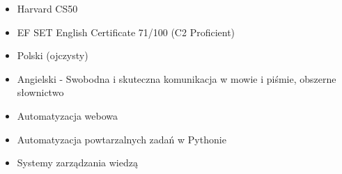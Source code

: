 











\medskip


\begin{itemize}
    \item Harvard CS50
\end{itemize}


\begin{itemize}
    \item EF SET English Certificate 71/100 (C2 Proficient)
\end{itemize}

\begin{itemize}
    \item Polski (ojczysty)
    \item Angielski - Swobodna i skuteczna komunikacja w mowie i piśmie, obszerne słownictwo
\end{itemize}
\smallskip
\begin{itemize}
\item Automatyzacja webowa

\item Automatyzacja powtarzalnych zadań w Pythonie

\item Systemy zarządzania wiedzą

\end{itemize}